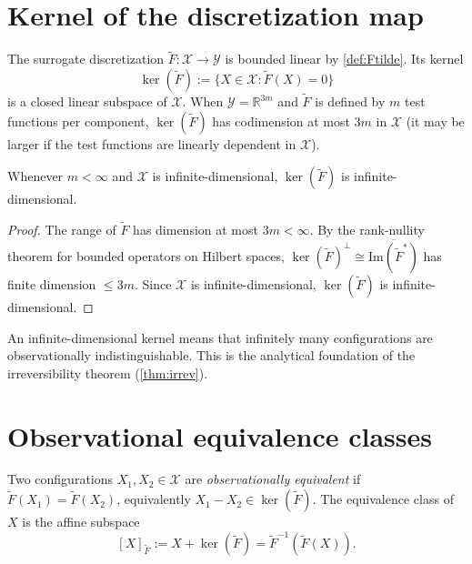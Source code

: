 \documentclass[12pt, oneside]{memoir}
\newcommand{\X}{\mathcal{X}}
\newcommand{\Ft}{\widetilde{F}}
\begin{document}
\section{Kernel of the discretization map}

The surrogate discretization $\Ft: \X \to \mathcal{Y}$ is bounded linear by
\cref{def:Ftilde}.  Its kernel
\[
  \ker(\Ft) := \{X \in \X : \Ft(X) = 0\}
\]
is a closed linear subspace of $\X$.  When $\mathcal{Y} = \mathbb{R}^{3m}$ and $\Ft$
is defined by $m$ test functions per component, $\ker(\Ft)$ has codimension at most $3m$
in $\X$ (it may be larger if the test functions are linearly dependent in $\X$).

\begin{proposition}
\label{prop:kernel-nontrivial}
Whenever $m < \infty$ and $\X$ is infinite-dimensional, $\ker(\Ft)$ is infinite-dimensional.
\end{proposition}

\begin{proof}
The range of $\Ft$ has dimension at most $3m < \infty$.  By the rank-nullity theorem for
bounded operators on Hilbert spaces, $\ker(\Ft)^\perp \cong \overline{\mathrm{Im}(\Ft^*)}$
has finite dimension $\le 3m$.  Since $\X$ is infinite-dimensional, $\ker(\Ft)$ is
infinite-dimensional.
\end{proof}

An infinite-dimensional kernel means that infinitely many configurations are
observationally indistinguishable.  This is the analytical foundation of the irreversibility
theorem (\cref{thm:irrev}).

\section{Observational equivalence classes}

Two configurations $X_1, X_2 \in \X$ are \emph{observationally equivalent} if
$\Ft(X_1) = \Ft(X_2)$, equivalently $X_1 - X_2 \in \ker(\Ft)$.  The equivalence class
of $X$ is the affine subspace
\[
  [X]_{\Ft} := X + \ker(\Ft) = \Ft^{-1}(\Ft(X)).
\]
\end{document}
